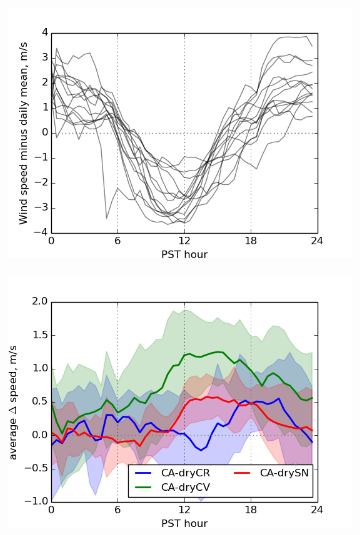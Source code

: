 \begin{figure}[here]
\begin{subfigure}{0.5\textwidth}
\includegraphics[width=1\textwidth]{ch3-wind/img/solano_controlwind_minusmean_CA0pt25_d02_level0.png}
\caption{}
\end{subfigure}
\begin{subfigure}{0.5\textwidth}
\includegraphics[width=1\textwidth]{ch3-wind/img/solano_diurnalwind_dry_regions_d02_level0.png}
\caption{}
\end{subfigure}
\begin{subfigure}{0.5\textwidth}

\end{subfigure}
\end{figure}
